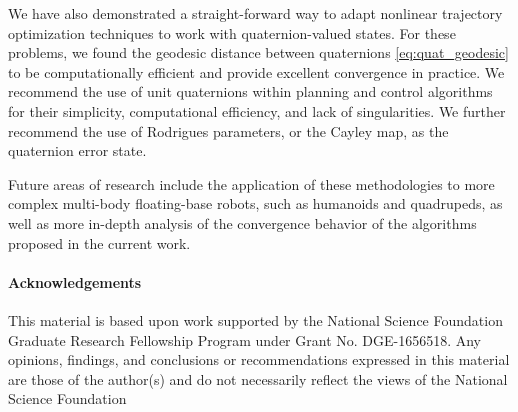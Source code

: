 \documentclass[letterpaper, 10 pt, conference]{ieeeconf}  %
\begin{document}
    We have also demonstrated a straight-forward way to adapt nonlinear trajectory
    optimization techniques to work with quaternion-valued states. For these problems, we
    found the geodesic distance between quaternions \eqref{eq:quat_geodesic} to be
    computationally efficient and provide excellent convergence in practice. We recommend
    the use of unit quaternions within planning and control algorithms for their
    simplicity, computational efficiency, and lack of singularities. We further recommend
    the use of Rodrigues parameters, or the Cayley map, as the quaternion error state.
    
    Future areas of research include the application of these methodologies to more
    complex multi-body floating-base robots, such as humanoids and quadrupeds, as well as
    more in-depth analysis of the convergence behavior of the algorithms proposed in the
    current work.
    
\paragraph{Acknowledgements}
This material is based upon work supported by the National Science Foundation Graduate
Research Fellowship Program under Grant No. DGE-1656518. Any opinions, findings, and
conclusions or recommendations expressed in this material are those of the author(s) and
do not necessarily reflect the views of the National Science Foundation


\printbibliography
\end{document}
